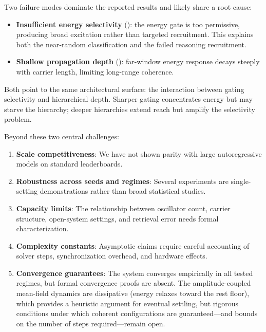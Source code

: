 \documentclass[11pt,a4paper]{article}
\begin{document}
Two failure modes dominate the reported results and likely share a root cause:
\begin{itemize}[nosep]
  \item \textbf{Insufficient energy selectivity} (): the energy gate is too permissive, producing broad excitation rather than targeted recruitment. This explains both the near-random classification and the failed reasoning recruitment.
  \item \textbf{Shallow propagation depth} (): far-window energy response decays steeply with carrier length, limiting long-range coherence.
\end{itemize}
Both point to the same architectural surface: the interaction between gating selectivity and hierarchical depth. Sharper gating concentrates energy but may starve the hierarchy; deeper hierarchies extend reach but amplify the selectivity problem.

\noindent Beyond these two central challenges:
\begin{enumerate}[nosep]
  \item \textbf{Scale competitiveness}: We have not shown parity with large autoregressive models on standard leaderboards.
  \item \textbf{Robustness across seeds and regimes}: Several experiments are single-setting demonstrations rather than broad statistical studies.
  \item \textbf{Capacity limits}: The relationship between oscillator count, carrier structure, open-system settings, and retrieval error needs formal characterization.
  \item \textbf{Complexity constants}: Asymptotic claims require careful accounting of solver steps, synchronization overhead, and hardware effects.
  \item \textbf{Convergence guarantees}: The system converges empirically in all tested regimes, but formal convergence proofs are absent. The amplitude-coupled mean-field dynamics are dissipative (energy relaxes toward the rest floor), which provides a heuristic argument for eventual settling, but rigorous conditions under which coherent configurations are guaranteed---and bounds on the number of steps required---remain open.
\end{enumerate}
\end{document}
